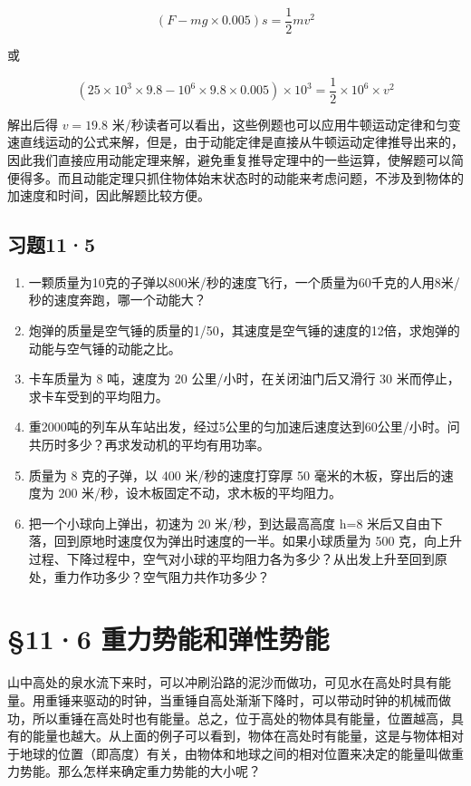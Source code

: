 \[
(F-mg\times0.005)s=\frac{1}{2}mv^{2}
\]

或

\[
(25 \times 10 ^ {3} \times 9.8 - 10 ^ {6} \times 9.8 \times 0.005) \times 10 ^ {3} = \frac {1}{2} \times 10 ^ {6} \times v ^ {2}
\]

解出后得 \(v = 19.8\)
米/秒读者可以看出，这些例题也可以应用牛顿运动定律和匀变速直线运动的公式来解，但是，由于动能定律是直接从牛顿运动定律推导出来的，因此我们直接应用动能定理来解，避免重复推导定理中的一些运算，使解题可以简便得多。而且动能定理只抓住物体始末状态时的动能来考虑问题，不涉及到物体的加速度和时间，因此解题比较方便。

\subsection{习题11·5}\label{ux4e60ux9898115}

\begin{enumerate}
\def\labelenumi{\arabic{enumi}.}
\item
  一颗质量为10克的子弹以800米/秒的速度飞行，一个质量为60千克的人用8米/秒的速度奔跑，哪一个动能大？
\item
  炮弹的质量是空气锤的质量的1/50，其速度是空气锤的速度的12倍，求炮弹的动能与空气锤的动能之比。
\item
  卡车质量为 8 吨，速度为 20 公里/小时，在关闭油门后又滑行 30
  米而停止，求卡车受到的平均阻力。
\item
  重2000吨的列车从车站出发，经过5公里的匀加速后速度达到60公里/小时。问共历时多少？再求发动机的平均有用功率。
\item
  质量为 8 克的子弹，以 400 米/秒的速度打穿厚 50
  毫米的木板，穿出后的速度为 200
  米/秒，设木板固定不动，求木板的平均阻力。
\item
  把一个小球向上弹出，初速为 20 米/秒，到达最高高度 h=8
  米后又自由下落，回到原地时速度仅为弹出时速度的一半。如果小球质量为 500
  克，向上升过程、下降过程中，空气对小球的平均阻力各为多少？从出发上升至回到原处，重力作功多少？空气阻力共作功多少？
\end{enumerate}

\section{§11·6
重力势能和弹性势能}\label{ux91cdux529bux52bfux80fdux548cux5f39ux6027ux52bfux80fd}

山中高处的泉水流下来时，可以冲刷沿路的泥沙而做功，可见水在高处时具有能量。用重锤来驱动的时钟，当重锤自高处渐渐下降时，可以带动时钟的机械而做功，所以重锤在高处时也有能量。总之，位于高处的物体具有能量，位置越高，具有的能量也越大。从上面的例子可以看到，物体在高处时有能量，这是与物体相对于地球的位置（即高度）有关，由物体和地球之间的相对位置来决定的能量叫做重力势能。那么怎样来确定重力势能的大小呢？

